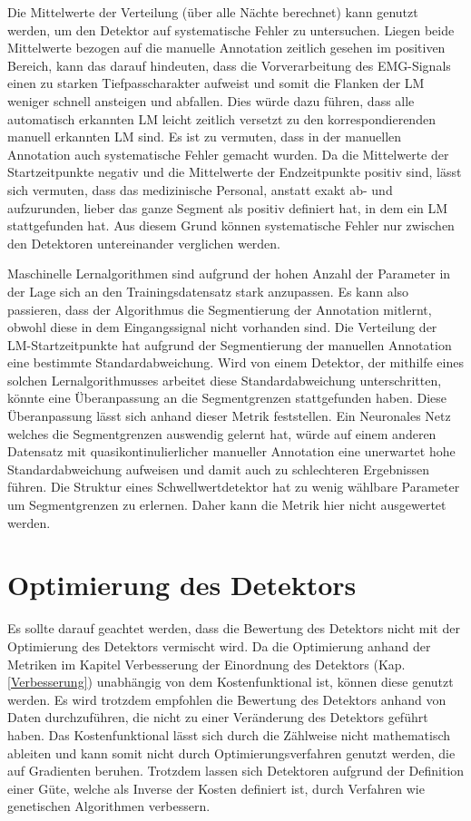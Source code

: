 Die Mittelwerte der Verteilung (über alle Nächte berechnet) kann genutzt werden, um den Detektor auf systematische Fehler zu untersuchen. Liegen beide Mittelwerte bezogen auf die manuelle Annotation zeitlich gesehen im positiven Bereich, kann das darauf hindeuten, dass die Vorverarbeitung des EMG-Signals einen zu starken Tiefpasscharakter aufweist und somit die Flanken der LM weniger schnell ansteigen und abfallen. Dies würde dazu führen, dass alle automatisch erkannten LM leicht zeitlich versetzt zu den korrespondierenden manuell erkannten LM sind.
Es ist zu vermuten, dass in der manuellen Annotation auch systematische Fehler gemacht wurden. Da die Mittelwerte der Startzeitpunkte negativ und die Mittelwerte der Endzeitpunkte positiv sind, lässt sich vermuten, dass das medizinische Personal, anstatt exakt ab- und aufzurunden, lieber das ganze Segment als positiv definiert hat, in dem ein LM stattgefunden hat.
Aus diesem Grund können systematische Fehler nur zwischen den Detektoren untereinander verglichen werden.

Maschinelle Lernalgorithmen sind aufgrund der hohen Anzahl der Parameter in der Lage sich an den Trainingsdatensatz stark anzupassen. Es kann also passieren, dass der Algorithmus die Segmentierung der Annotation mitlernt, obwohl diese in dem Eingangssignal nicht vorhanden sind.
Die Verteilung der LM-Startzeitpunkte hat aufgrund der Segmentierung der manuellen Annotation eine bestimmte Standardabweichung. Wird von einem Detektor, der mithilfe eines solchen Lernalgorithmusses arbeitet diese Standardabweichung unterschritten, könnte eine Überanpassung an die Segmentgrenzen stattgefunden haben. Diese Überanpassung lässt sich anhand dieser Metrik feststellen. 
Ein Neuronales Netz welches die Segmentgrenzen auswendig gelernt hat, würde auf einem anderen Datensatz mit quasikontinulierlicher manueller Annotation eine unerwartet hohe Standardabweichung aufweisen und damit auch zu schlechteren Ergebnissen führen. Die Struktur eines Schwellwertdetektor hat zu wenig wählbare Parameter um Segmentgrenzen zu erlernen. Daher kann die Metrik hier nicht ausgewertet werden.



\section{Optimierung des Detektors}

Es sollte darauf geachtet werden, dass die Bewertung des Detektors nicht mit der Optimierung des Detektors vermischt wird. Da die Optimierung anhand der Metriken im Kapitel Verbesserung der Einordnung des Detektors (Kap. \ref{Verbesserung}) unabhängig von dem Kostenfunktional ist, können diese genutzt werden. 
Es wird trotzdem empfohlen die Bewertung des Detektors anhand von Daten durchzuführen, die nicht zu einer Veränderung des Detektors geführt haben.
Das Kostenfunktional lässt sich durch die Zählweise nicht mathematisch ableiten und kann somit nicht durch Optimierungsverfahren genutzt werden, die auf Gradienten beruhen. Trotzdem lassen sich Detektoren aufgrund der Definition einer Güte, welche als Inverse der Kosten definiert ist, durch Verfahren wie genetischen Algorithmen verbessern.